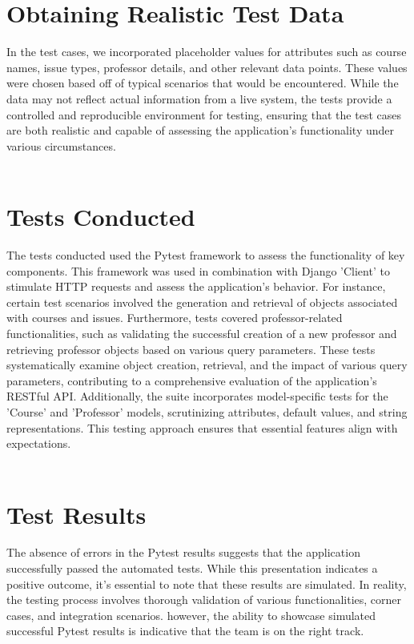 \documentclass[oneside,openany,obeyspaces]{book}
\newcommand\tab[1][1cm]{\hspace*{#1}}
\begin{document}
\begin{flushleft}
    \section{Obtaining Realistic Test Data}
    \tab In the test cases, we incorporated placeholder values for attributes such as course names, issue types, professor details, and other relevant data points. These values were chosen based off of typical scenarios that would be encountered. While the data may not reflect actual information from a live system, the tests provide a controlled and reproducible environment for testing, ensuring that the test cases are both realistic and capable of assessing the application's functionality under various circumstances.\\~\\


    \section{Tests Conducted}

    \tab The tests conducted used the Pytest framework to assess the functionality of key components. This framework was used in combination with Django 'Client' to stimulate HTTP requests and assess the application's behavior. For instance, certain test scenarios involved the generation and retrieval of objects associated with courses and issues. Furthermore, tests covered professor-related functionalities, such as validating the successful creation of a new professor and retrieving professor objects based on various query parameters. These tests systematically examine object creation, retrieval, and the impact of various query parameters, contributing to a comprehensive evaluation of the application's RESTful API. Additionally, the suite incorporates model-specific tests for the 'Course' and 'Professor' models, scrutinizing attributes, default values, and string representations. This testing approach ensures that essential features align with expectations.\\~\\


    \section{Test Results}

    \tab The absence of errors in the Pytest results suggests that the application successfully passed the automated tests. While this presentation indicates a positive outcome, it's essential to note that these results are simulated. In reality, the testing process involves thorough validation of various functionalities, corner cases, and integration scenarios. however, the ability to showcase simulated successful Pytest results is indicative that the team is on the right track.\\~\\



\end{flushleft}
\end{document}
